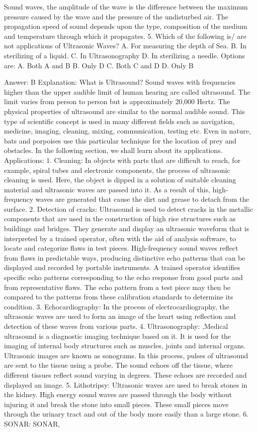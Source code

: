 Sound waves, the amplitude of the wave is the difference between the maximum pressure caused by the wave and the pressure of the undisturbed air. The propagation speed of sound depends upon the type, composition of the medium and temperature through which it propagates. 5. Which of the following is/ are not applications of Ultrasonic Waves? A. For measuring the depth of Sea. B. In sterilizing of a liquid. C. In Ultrasonography D. In sterilizing a needle. Options are: A. Both A and B B. Only D C. Both C and D D. Only B 

Answer: B
Explanation: What is Ultrasound? Sound waves with frequencies higher than the upper audible limit of human hearing are called ultrasound. The limit varies from person to person but is approximately 20,000 Hertz. The physical properties of ultrasound are similar to the normal audible sound. This type of scientific concept is used in many different fields such as navigation, medicine, imaging, cleaning, mixing, communication, testing etc. Even in nature, bats and porpoises use this particular technique for the location of prey and obstacles. In the following section, we shall learn about its applications. Applications: 1. Cleaning: In objects with parts that are difficult to reach, for example, spiral tubes and electronic components, the process of ultrasonic cleaning is used. Here, the object is dipped in a solution of suitable cleaning material and ultrasonic waves are passed into it. As a result of this, high-frequency waves are generated that cause the dirt and grease to detach from the surface. 2. Detection of cracks: Ultrasound is used to detect cracks in the metallic components that are used in the construction of high rise structures such as buildings and bridges. They generate and display an ultrasonic waveform that is interpreted by a trained operator, often with the aid of analysis software, to locate and categorize flaws in test pieces. High-frequency sound waves reflect from flaws in predictable ways, producing distinctive echo patterns that can be displayed and recorded by portable instruments. A trained operator identifies specific echo patterns corresponding to the echo response from good parts and from representative flaws. The echo pattern from a test piece may then be compared to the patterns from these calibration standards to determine its condition. 3. Echocardiography: In the process of electrocardiography, the ultrasonic waves are used to form an image of the heart using reflection and detection of these waves from various parts. 4. Ultrasonography: ,Medical ultrasound is a diagnostic imaging technique based on it. It is used for the imaging of internal body structures such as muscles, joints and internal organs. Ultrasonic images are known as sonograms. In this process, pulses of ultrasound are sent to the tissue using a probe. The sound echoes off the tissue, where different tissues reflect sound varying in degrees. These echoes are recorded and displayed an image. 5. Lithotripsy: Ultrasonic waves are used to break stones in the kidney. High energy sound waves are passed through the body without injuring it and break the stone into small pieces. These small pieces move through the urinary tract and out of the body more easily than a large stone. 6. SONAR: SONAR, 
